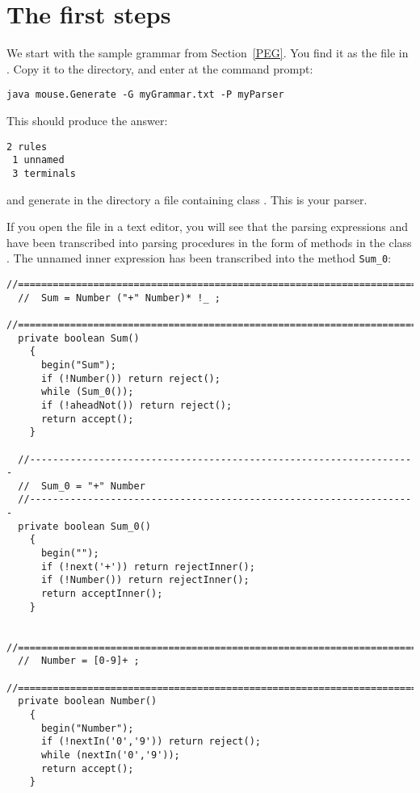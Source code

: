 \newpage

\section{The first steps}


We start with the sample grammar from Section~\ref{PEG}.
You find it as the file  in .
Copy it to the  directory,
and enter at the command prompt:

\small
\begin{Verbatim}[samepage=true,xleftmargin=15mm,baselinestretch=0.8]
 java mouse.Generate -G myGrammar.txt -P myParser
\end{Verbatim}
\normalsize
%      
This should produce the answer: 
%      
\small
\begin{Verbatim}[samepage=true,xleftmargin=15mm,baselinestretch=0.8]
 2 rules
 1 unnamed
 3 terminals
\end{Verbatim}
\normalsize
%      
and generate in the  directory a file 
containing class .
This is your parser.

If you open the file in a text editor, you will see that the 
parsing expressions  and  have been transcribed
into parsing procedures in the form of methods in the class . 
The unnamed inner expression  has been transcribed
into the method \verb#Sum_0#:

\small
\begin{Verbatim}[frame=single,framesep=2mm,samepage=true,xleftmargin=15mm,xrightmargin=15mm,baselinestretch=0.8]
  //=====================================================================
  //  Sum = Number ("+" Number)* !_ ;
  //=====================================================================
  private boolean Sum()
    {
      begin("Sum");
      if (!Number()) return reject();
      while (Sum_0());
      if (!aheadNot()) return reject();
      return accept();
    }
  
  //-------------------------------------------------------------------
  //  Sum_0 = "+" Number
  //-------------------------------------------------------------------
  private boolean Sum_0()
    {
      begin("");
      if (!next('+')) return rejectInner();
      if (!Number()) return rejectInner();
      return acceptInner();
    }
  
  //=====================================================================
  //  Number = [0-9]+ ;
  //=====================================================================
  private boolean Number()
    {
      begin("Number");
      if (!nextIn('0','9')) return reject();
      while (nextIn('0','9'));
      return accept();
    }
\end{Verbatim}
\normalsize

